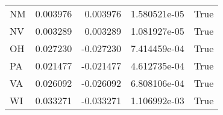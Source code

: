 \begin{table}
\begin{tabular}{lrrrl}
      NM &   0.003976 &  0.003976 &   1.580521e-05 &          True \\
      NV &   0.003289 &  0.003289 &   1.081927e-05 &          True \\
      OH &   0.027230 & -0.027230 &   7.414459e-04 &          True \\
      PA &   0.021477 & -0.021477 &   4.612735e-04 &          True \\
      VA &   0.026092 & -0.026092 &   6.808106e-04 &          True \\
      WI &   0.033271 & -0.033271 &   1.106992e-03 &          True \\
\bottomrule
\end{tabular}
\end{table}
